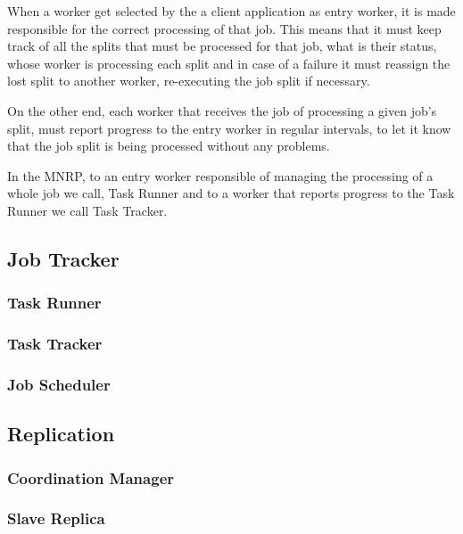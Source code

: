 \documentclass[times, 10pt,twocolumn]{article}
\begin{document}
        When a worker get selected by the a client application as entry worker, it is made responsible for the correct processing of that job. This means that it must keep track of all the splits that must be processed for that job, what is their status, whose worker is processing each split and in case of a failure it must reassign the lost split to another worker, re-executing the job split if necessary.
        
        On the other end, each worker that receives the job of processing a given job's split, must report progress to the entry worker in regular intervals, to let it know that the job split is being processed without any problems.
        
        In the \ac{MNRP}, to an entry worker responsible of managing the processing of a whole job we call, Task Runner and to a worker that reports progress to the Task Runner we call Task Tracker.
       
    	\subsection{Job Tracker}
    	
        \subsubsection{Task Runner}

        \subsubsection{Task Tracker}

    	\subsubsection{Job Scheduler}
        
        \subsection{Replication}
        
        	\subsubsection{Coordination Manager}
        	
        	\subsubsection{Slave Replica}
    	
\end{document}
